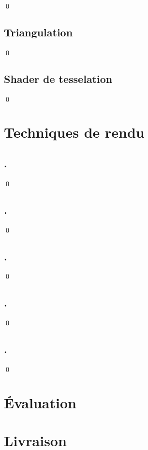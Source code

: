 \documentclass[12pt]{article}
\newcommand{\state}{\noindent}
\begin{document}
\state

\qed

\subsection{Triangulation}

\state

\qed

\subsection{Shader de tesselation}

\state

\qed


\pagebreak

\section{Techniques de rendu}

\subsection{.}

\state

\qed

\subsection{.}

\state

\qed

\subsection{.}

\state

\qed

\subsection{.}

\state

\qed

\subsection{.}

\state

\qed

\pagebreak

\section*{Évaluation}

\pagebreak

\section*{Livraison}

\pagebreak
\end{document}
